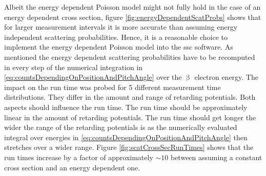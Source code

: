 Albeit the energy dependent Poisson model might not fully hold in the case of an energy dependent cross section, figure \ref{fig:energyDependentScatProbs} shows that for larger measurement intervals it is more accurate than assuming energy independent scattering probabilities. Hence, it is a reasonable choice to implement the energy dependent Poisson model into the \gls{ssc} software. As mentioned the energy dependent scattering probabilities have to be recomputed in every step of the numerical integration in \eqref{eq:countsDependingOnPositionAndPitchAngle} over the $\upbeta$ electron energy. The impact on the run time was probed for 5 different measurement time distributions. They differ in the amount and range of retarding potentials. Both aspects should influence the run time. The run time should be approximately linear in the amount of retarding potentials. The run time should get longer the wider the range of the retarding potentials is as the numerically evaluated integral over energies in \eqref{eq:countsDependingOnPositionAndPitchAngle} then stretches over a wider range. Figure \ref{fig:scatCrossSecRunTimes} shows that the run times increase by a factor of approximately $\sim10$  between assuming a constant cross section and an energy dependent one.

